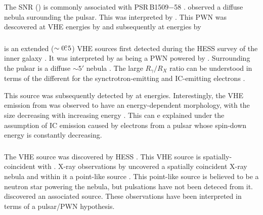 \subsubsection{\mshfifteenfiftytwo}

The \ac{SNR}  (\mshfifteenfiftytwo)
\cite{caswell_1981a_high-resolution-radio} is commonly
associated with PSR\,B1509$-$58 \cite{seward_1982a_x-ray-pulsar}.
\cite{seward_1982a_x-ray-pulsar} observed a diffuse nebula surounding the
pulsar. This was interpreted by \cite{trussoni_1996a_rosat-observations}.
This \ac{PWN} was descovered at \ac{VHE} energies by
\cite{aharonian_2005a_discovery-extended} and subsequently at \gev
energies by \cite{abdo_2010a_detection-energetic}

\subsubsection{}

 is an extended ($\sim0\mbox{$.\!\!^\circ$}5$) \ac{VHE} sources
first detected during the \ac{HESS} survey of the inner
galaxy \citep{aharonian_2006a_h.e.s.s.-survey}.  It was
interpreted by \cite{aharonian_2005a_possible-association}
as being a \ac{PWN} powered by  \citep[also known as
,][]{clifton_1992a_high-frequency-survey}.  Surrounding the
pulsar is a diffuse $\sim 5'$ nebula \cite{finley_1996a_morphology-young}.
The large $R_\gamma/R_X$ ratio can be understood in terms of the
different for the synctrotron-emitting and \ac{IC}-emitting electrons
\citep{aharonian_2006a_h.e.s.s.-survey}.

This source was subsequently detected by
\cite{grondin_2011a_detection-pulsar} at \gev energies.  Interestingly,
the \ac{VHE} emission from  was observed to have an
energy-dependent morphology, with the size decreasing with increasing
energy \citep{aharonian_2006a_energy-dependent}.  This can e explained
under the assumption of \ac{IC} emission caused by electrons from a
pulsar whose spin-down energy is constantly decreasing.

\subsubsection{}

The \ac{VHE} source  was discovered by
\ac{HESS} \citep{aharonian_2006a_h.e.s.s.-survey}.  This
\ac{VHE} source is spatially-coincident with 
\citep{shaver_1970a_galactic-radio}.  X-ray observations by
\xmmnewton uncovered a spatially coincident X-ray nebula and within it
a point-like source \cite{funk_2007a_xmm-newton-observations}.
This point-like source is believed to be a neutron star powering the
nebula, but pulsations have not been deteced from it.
\cite{slane_2010_fermi-detection} discovered an associated \gev source.
These observations have been interpreted in terms of a pulsar/\ac{PWN}
hypothesis.

